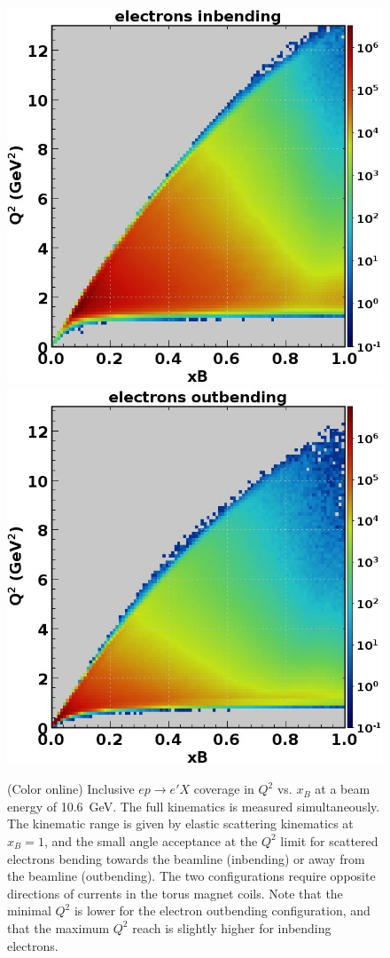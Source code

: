 \documentclass[final,3p,twocolumn]{elsarticle}
\begin{document}
\begin{figure}[th!]
\centerline{\includegraphics[width=0.9\columnwidth]{epX-in.jpg}
\hspace{1cm}\includegraphics[width=0.9\columnwidth]{epX-out.jpg}}
\caption{(Color online) Inclusive $ep \to e'X$ coverage in $Q^2$ vs. $x_B$ at a beam energy of 10.6~GeV. The full kinematics is
  measured simultaneously. The kinematic range is given by elastic scattering kinematics at $x_B = 1$, and the small
  angle acceptance at the $Q^2$ limit for scattered electrons bending towards the beamline (inbending) or away
  from the beamline (outbending). The two configurations require opposite directions of currents in the torus magnet
  coils. Note that the minimal $Q^2$ is lower for the electron outbending configuration, and that the maximum $Q^2$
  reach is slightly higher for inbending electrons.} 
\label{electron-acceptance}
\end{figure}
\end{document}
